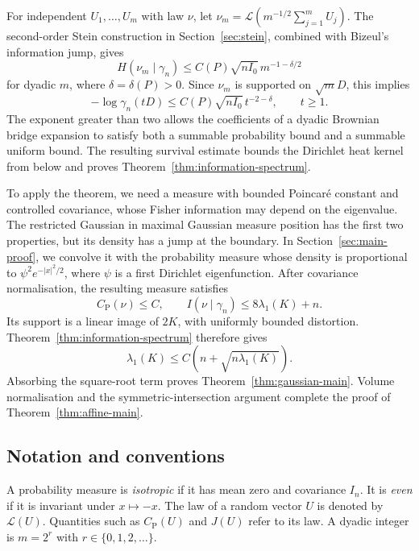 \documentclass[11pt]{amsart}
\numberwithin{equation}{section}
\theoremstyle{definition}
\theoremstyle{remark}
\newcommand{\Id}{I_n}
\newcommand{\gam}{\gamma_n}
\newcommand{\CP}{C_{\mathrm P}}
\begin{document}
For independent \(U_1,\ldots,U_m\) with law \(\nu\), let
\(\nu_m=\mathcal L(m^{-1/2}\sum_{j=1}^m U_j)\).
The second-order Stein construction in Section~\ref{sec:stein}, combined
with Bizeul's information jump, gives
\[
H(\nu_m\mid\gam)\le C(P)\sqrt{nI_0}\,m^{-1-\delta/2}
\]
for dyadic \(m\), where \(\delta=\delta(P)>0\).
Since \(\nu_m\) is supported on \(\sqrt mD\), this implies
\[
-\log\gam(tD)\le C(P)\sqrt{nI_0}\,t^{-2-\delta},\qquad t\ge1.
\]
The exponent greater than two allows the coefficients of a dyadic
Brownian bridge expansion to satisfy both a summable probability bound
and a summable uniform bound. The resulting survival estimate bounds the
Dirichlet heat kernel from below and proves
Theorem~\ref{thm:information-spectrum}.

To apply the theorem, we need a measure with bounded Poincar\'e constant
and controlled covariance, whose Fisher information may depend on the
eigenvalue. The restricted Gaussian in maximal Gaussian measure position
has the first two properties, but its density has a jump at the boundary.
In Section~\ref{sec:main-proof}, we convolve it with the probability
measure whose density is proportional to \(\psi^2e^{-|x|^2/2}\), where
\(\psi\) is a first Dirichlet eigenfunction. After covariance
normalisation, the resulting measure satisfies
\[
\CP(\nu)\le C,\qquad I(\nu\mid\gam)\le8\lambda_1(K)+n.
\]
Its support is a linear image of \(2K\), with uniformly bounded
distortion. Theorem~\ref{thm:information-spectrum} therefore gives
\[
\lambda_1(K)\le C\left(n+\sqrt{n\lambda_1(K)}\right).
\]
Absorbing the square-root term proves Theorem~\ref{thm:gaussian-main}.
Volume normalisation and the symmetric-intersection argument complete
the proof of Theorem~\ref{thm:affine-main}.

\subsection{Notation and conventions}

A probability measure is \emph{isotropic} if it has mean zero and
covariance \(\Id\). It is \emph{even} if it is invariant under
\(x\mapsto-x\). The law of a random vector \(U\) is denoted by
\(\mathcal L(U)\). Quantities such as \(\CP(U)\) and \(J(U)\) refer
to its law. A dyadic integer is \(m=2^r\) with \(r\in\{0,1,2,\ldots\}\).
\end{document}
